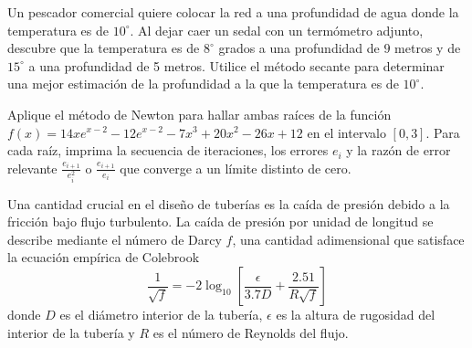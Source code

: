 \begin{questions}
    Un pescador comercial quiere colocar la red a una profundidad de
    agua donde la temperatura es de $10^{\circ}$.
    Al dejar caer un sedal con un termómetro adjunto, descubre que
    la temperatura es de $8^{\circ}$ grados a una profundidad de $9$
    metros y de $15^{\circ}$ a una profundidad de 5 metros.
    Utilice el método secante para determinar una mejor estimación de
    la profundidad a la que la temperatura es de $10^{\circ}$.


    \question

    Aplique el método de Newton para hallar ambas raíces de la
    función
    \begin{math}
        f\left(x\right)=
        14xe^{x-2}-
        12e^{x-2}-
        7x^{3}+
        20x^2-
        26x+
        12
    \end{math}
    en el intervalo $\left[0,3\right]$.
    Para cada raíz, imprima la secuencia de iteraciones, los errores
    $e_{i}$ y la razón de error relevante $\frac{e_{i+1}}{e^{2}_{i}}$
    o $\frac{e_{i+1}}{e_{i}}$ que converge a un límite distinto de
    cero.

    \question

    Una cantidad crucial en el diseño de tuberías es la caída de
    presión debido a la fricción bajo flujo turbulento.
    La caída de presión por unidad de longitud se describe mediante
    el número de Darcy $f$, una cantidad adimensional que satisface
    la ecuación empírica de Colebrook
    \begin{equation*}
        \frac{1}{\sqrt{f}}=
        -2\log_{10}\left[\frac{\epsilon}{3.7D}+
            \frac{2.51}{R\sqrt{f}}\right]
    \end{equation*}
    donde $D$ es el diámetro interior de la tubería, $\epsilon$ es la
    altura de rugosidad del interior de la tubería y $R$ es el número
    de Reynolds del flujo.

\end{questions}
